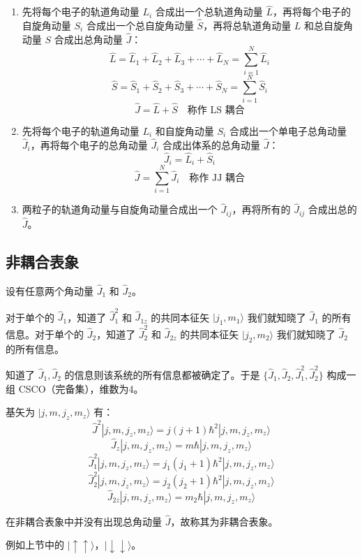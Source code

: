 \documentclass[lang=cn,10pt]{elegantbook}
\begin{document}
\begin{enumerate}
	\item 先将每个电子的轨道角动量 $L_i$ 合成出一个总轨道角动量 $\hat{L}$，再将每个电子的自旋角动量 $S_i$ 合成出一个总自旋角动量 $\hat{S}$，再将总轨道角动量 $L$ 和总自旋角动量 $S$ 合成出总角动量 $\hat{J}$：
	\[
	\hat{L} = \hat{L}_1 + \hat{L}_2 + \hat{L}_3 + \cdots + \hat{L}_N = \sum_{i=1}^{N} \hat{L}_i
	\]
	\[
	\hat{S} = \hat{S}_1 + \hat{S}_2 + \hat{S}_3 + \cdots + \hat{S}_N = \sum_{i=1}^{N} \hat{S}_i
	\]
	\[
	\hat{J} = \hat{L} + \hat{S} \quad \text{称作 LS 耦合}
	\]
	
	\item 先将每个电子的轨道角动量 $L_i$ 和自旋角动量 $S_i$ 合成出一个单电子总角动量 $\hat{J}_i$，再将每个电子的总角动量 $\hat{J}_i$ 合成出体系的总角动量 $\hat{J}$：
	\[
	\hat{J}_i = \hat{L}_i + \hat{S}_i
	\]
	\[
	\hat{J} = \sum_{i=1}^{N} \hat{J}_i \quad \text{称作 JJ 耦合}
	\]
	
	\item 两粒子的轨道角动量与自旋角动量合成出一个 $\hat{J}_{ij}$，再将所有的 $\hat{J}_{ij}$ 合成出总的 $\hat{J}$。
\end{enumerate}

\subsection{非耦合表象}
设有任意两个角动量 $\hat{J}_1$ 和 $\hat{J}_2$。

对于单个的 $\hat{J}_1$，知道了 $\hat{J}_1^2$ 和 $\hat{J}_{1z}$ 的共同本征矢 $|j_1, m_1\rangle$ 我们就知晓了 $\hat{J}_1$ 的所有信息。对于单个的 $\hat{J}_2$，知道了 $\hat{J}_2^2$ 和 $\hat{J}_{2z}$ 的共同本征矢 $|j_2, m_2\rangle$ 我们就知晓了 $\hat{J}_2$ 的所有信息。

知道了 $\hat{J}_1, \hat{J}_2$ 的信息则该系统的所有信息都被确定了。于是 $\{\hat{J}_1, \hat{J}_2, \hat{J}_1^2, \hat{J}_2^2\}$ 构成一组 CSCO（完备集），维数为4。

基矢为 $|j, m, j_z, m_z\rangle$ 有：
\[
\hat{J}^2 |j, m, j_z, m_z\rangle = j(j+1) \hbar^2 |j, m, j_z, m_z\rangle
\]
\[
\hat{J}_z |j, m, j_z, m_z\rangle = m \hbar |j, m, j_z, m_z\rangle
\]
\[
\hat{J}_1^2 |j, m, j_z, m_z\rangle = j_1(j_1+1) \hbar^2 |j, m, j_z, m_z\rangle
\]
\[
\hat{J}_2^2 |j, m, j_z, m_z\rangle = j_2(j_2+1) \hbar^2 |j, m, j_z, m_z\rangle
\]
\[
\hat{J}_{2z} |j, m, j_z, m_z\rangle = m_2 \hbar |j, m, j_z, m_z\rangle
\]

在非耦合表象中并没有出现总角动量 $\hat{J}$，故称其为非耦合表象。

例如上节中的 $|\uparrow \uparrow \rangle$，$|\downarrow \downarrow \rangle$。
\end{document}

